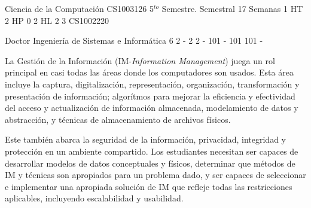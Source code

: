 \documentclass[a4paper,8pt]{article}
\begin{document}
\setNombreProfesor{}
\setGradoProfesorAbreviado{}
\sylabusHeader

\academicaTable
{Ciencia de la Computación} %
{CS1003126} %
{5$^{to}$ Semestre.} %
{Semestral} %
{17 Semanas} %
{1 HT} %
{2 HP} %
{0} %
{2 HL}  %
{2} %
{3} %
{CS1002220} %

\administrativaTable
{Doctor} %
{Ingeniería de Sistemas e Informática} %
{6} %
{2} %
{-} %
{2} %
{2} %
{-} %
{101} %
{-} %
{101} %
{101} %
{-} %


\begin{fundamentacion}
La Gestión de la Información (IM-\textit{Information Management}) juega un rol principal en casi todas las áreas donde los computadores son usados. Esta área incluye la captura, digitalización, representación, organización, transformación y presentación de información; algorítmos para mejorar la eficiencia y efectividad del acceso y actualización de información almacenada, modelamiento de datos y abstracción, y técnicas de almacenamiento de archivos físicos.

Este también abarca la seguridad de la información, privacidad, integridad y protección en un ambiente compartido. Los estudiantes necesitan ser capaces de desarrollar modelos de datos conceptuales y físicos, determinar que métodos de IM y técnicas son apropiados para un problema dado, y ser capaces de seleccionar e implementar una apropiada solución de IM que refleje todas las restricciones aplicables, incluyendo escalabilidad y usabilidad.

\end{fundamentacion}

\begin{sumilla}
\item \IMPhysicalDatabaseDesign
\item \IMTransactionProcessing
\item \IMInformationStorageandRetrieval
\item \IMDistributedDatabases

\end{sumilla}
\end{document}
